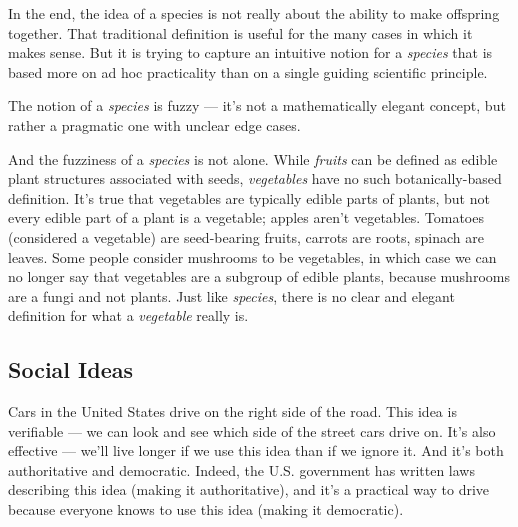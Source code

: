 \documentclass[11pt, oneside]{article}   	%
\begin{document}
In the end, the idea of a species is not really about the ability to make
offspring together.
That traditional definition is useful for the many cases in which it
makes sense.
But it is trying to capture an
intuitive notion for a {\em species} that is
based more on ad hoc practicality than on a single guiding scientific principle.

The notion of a {\em species} is fuzzy --- it's not a mathematically elegant
concept, but rather a pragmatic one with unclear edge cases.

And the fuzziness of a {\em species} is not alone. While {\em fruits} can be
defined as edible plant structures associated with seeds,
{\em vegetables} have no such botanically-based definition.
It's true that vegetables are typically edible parts of plants,
but not every edible part of a plant is a vegetable;
apples aren't vegetables.
Tomatoes (considered a vegetable) are seed-bearing fruits, carrots are roots,
spinach are leaves. Some people consider mushrooms to be vegetables, in which
case we can no longer say that vegetables are a subgroup of edible plants,
because mushrooms are a fungi and not plants.
Just like {\em species}, there is no clear and elegant definition for what a
{\em vegetable} really is.



\subsection{Social Ideas}

%
%

Cars in the United States drive on the right side of the road.
This idea is verifiable --- we can look and see which side of the street cars
drive on.
It's also effective --- we'll live
longer if we use this idea than if we ignore it.
And it's both authoritative and democratic. Indeed, the U.S.
government has written laws describing this idea (making it authoritative),
and it's a practical
way to drive
because everyone knows to use this idea (making it democratic).
\end{document}
